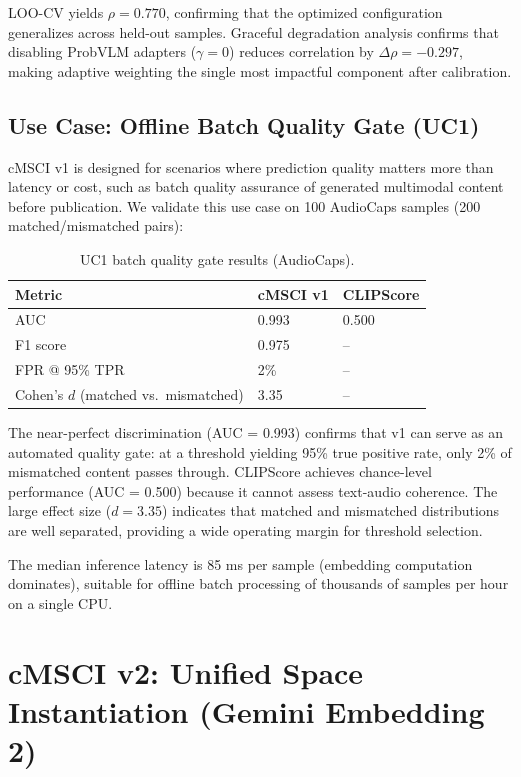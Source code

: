\documentclass[a4paper,fleqn]{cas-sc}
\begin{document}
\begin{itemize}
LOO-CV yields $\rho = 0.770$, confirming that the optimized configuration generalizes across held-out samples. Graceful degradation analysis confirms that disabling ProbVLM adapters ($\gamma = 0$) reduces correlation by $\Delta\rho = -0.297$, making adaptive weighting the single most impactful component after calibration.

\subsection{Use Case: Offline Batch Quality Gate (UC1)}\label{sec:uc1}

cMSCI v1 is designed for scenarios where prediction quality matters more than latency or cost, such as batch quality assurance of generated multimodal content before publication. We validate this use case on 100 AudioCaps samples (200 matched/mismatched pairs):

\begin{table}[t]
\caption{UC1 batch quality gate results (AudioCaps).}\label{tab:uc1}
\centering
\begin{tabular}{lll}
\toprule
Metric & cMSCI v1 & CLIPScore \\
\midrule
AUC & 0.993 & 0.500 \\
F1 score & 0.975 & -- \\
FPR @ 95\% TPR & 2\% & -- \\
Cohen's $d$ (matched vs.\ mismatched) & 3.35 & -- \\
\bottomrule
\end{tabular}
\end{table}

The near-perfect discrimination (AUC = 0.993) confirms that v1 can serve as an automated quality gate: at a threshold yielding 95\% true positive rate, only 2\% of mismatched content passes through. CLIPScore achieves chance-level performance (AUC = 0.500) because it cannot assess text-audio coherence. The large effect size ($d = 3.35$) indicates that matched and mismatched distributions are well separated, providing a wide operating margin for threshold selection.

The median inference latency is 85 ms per sample (embedding computation dominates), suitable for offline batch processing of thousands of samples per hour on a single CPU.

\section{cMSCI v2: Unified Space Instantiation (Gemini Embedding 2)}\label{sec:v2}


\end{itemize}
\end{document}
